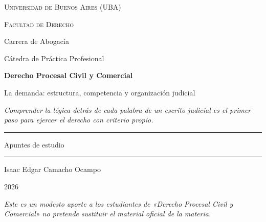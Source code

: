 \documentclass[12pt,oneside]{book}
\newcommand{\universidad}{Universidad de Buenos Aires (UBA)}
\newcommand{\facultad}{Facultad de Derecho}
\newcommand{\carrera}{Carrera de Abogacía}
\newcommand{\catedra}{Cátedra de Práctica Profesional}
\newcommand{\materia}{Derecho Procesal Civil y Comercial}
\newcommand{\titulo}{La demanda: estructura, competencia y organización judicial}
\newcommand{\autor}{Isaac Edgar Camacho Ocampo}
\newcommand{\anio}{2026}
\begin{document}
\begin{titlepage}

\thispagestyle{empty}

\begin{center}

\vspace*{1cm}

{\large \textsc{\universidad}}

\vspace{0.2cm}

{\large \textsc{\facultad}}

\vspace{0.2cm}

{\large \carrera}

\vspace{0.2cm}

{\normalsize \catedra}

\vspace{3cm}

{\Huge \textbf{\materia}}

\vspace{1cm}

{\LARGE \titulo}

\vspace{0.8cm}

\textit{Comprender la lógica detrás de cada palabra de un escrito judicial es el primer paso para ejercer el derecho con criterio propio.}

\vspace{1.2cm}

\rule{0.70\textwidth}{0.5pt}

\vspace{0.5cm}

{\large Apuntes de estudio}

\vspace{0.5cm}

\rule{0.70\textwidth}{0.5pt}

\vfill

{\large \autor}

\vspace{0.3cm}

{\large \anio}

\end{center}

\vfill

\begin{flushleft}
\textit{Este es un modesto aporte a los estudiantes de «Derecho Procesal Civil y Comercial» no pretende sustituir el material oficial de la materia.}
\end{flushleft}

\end{titlepage}
\end{document}
